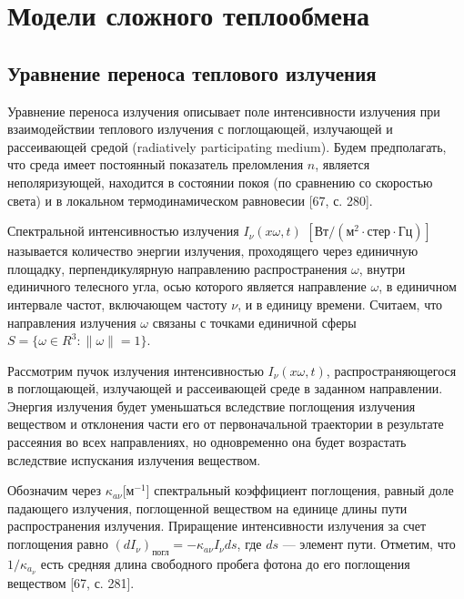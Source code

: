 \chapter{Модели сложного теплообмена}\label{ch:ch1}


\section{Уравнение переноса теплового излучения}\label{sec:ch1/sec1}


Уравнение переноса излучения описывает поле интенсивности излучения
при взаимодействии теплового излучения с поглощающей, излучающей и рассеивающей средой
(radiatively participating medium).
Будем предполагать, что среда имеет постоянный показатель преломления $n$, является неполяризующей,
находится в состоянии покоя (по сравнению со скоростью света) и в локальном
термодинамическом равновесии [67, с. 280].


Спектральной интенсивностью излучения $I_\nu (x \omega, t)$ $[\text{Вт}/(м^2 \cdot \text{стер} \cdot \text{Гц})]$
называется количество энергии излучения, проходящего через единичную
площадку, перпендикулярную направлению распространения $\omega$, внутри единичного телесного угла,
осью которого является направление $\omega$, в единичном
интервале частот, включающем частоту $\nu$, и в единицу времени.
Считаем, что направления излучения $\omega$ связаны с точками единичной
сферы $S = \{\omega \in R^3: \| \omega\| = 1\}$.


Рассмотрим пучок излучения интенсивностью $I_\nu (x \omega, t)$, распространяющегося в поглощающей,
излучающей и рассеивающей среде в заданном направлении.
Энергия излучения будет уменьшаться вследствие поглощения
излучения веществом и отклонения части его от первоначальной траектории в
результате рассеяния во всех направлениях, но одновременно она будет возрастать
вследствие испускания излучения веществом.


Обозначим через $\kappa_{a\nu}$[$\text{м}^{-1}$] спектральный коэффициент поглощения,
равный доле падающего излучения, поглощенной веществом на единице длины
пути распространения излучения.
Приращение интенсивности излучения за счет поглощения равно
$(dI_\nu)_\text{погл} = -\kappa_{a\nu} I_\nu ds$, где $ds$ — элемент пути.
Отметим, что $1/\kappa_{a_\nu}$ есть средняя длина свободного пробега фотона до его поглощения
веществом [67, с. 281].


